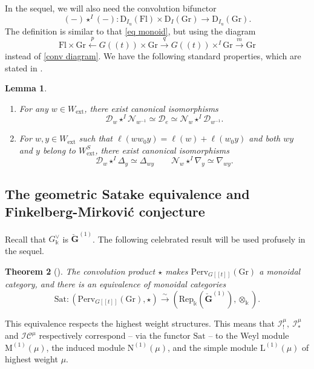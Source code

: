 \documentclass[11pt]{amsart}
\theoremstyle{plain}
\newtheorem{thm}{Theorem}[section]
\newtheorem{lem}[thm]{Lemma}
\theoremstyle{remark}
\numberwithin{equation}{section}
\begin{document}
	In the sequel, we will also need the convolution bifunctor 
	$$(-)\star^I(-):\mathrm{D}_{I_\mathrm{u}}(\mathrm{Fl})\times  \mathrm{D}_{I}(\mathrm{Gr})\to \mathrm{D}_{I_\mathrm{u}}(\mathrm{Gr}).$$
	The definition is similar to that \eqref{eq monoid}, but using the diagram 
	$$\mathrm{Fl}\times\mathrm{Gr}\xleftarrow{p}G((t))\times \mathrm{Gr}\xrightarrow{q} G((t))\times^{I} \mathrm{Gr}\xrightarrow{m}\mathrm{Gr} $$
	instead of \eqref{conv diagram}. We have the following standard properties, which are stated in \cite[Lemma 3.1]{achar2022geometric}.
	\begin{lem}\label{lem conv standard}
 \begin{enumerate}
     \item For any $w\in W_\mathrm{ext}$, there exist canonical isomorphisms
     $$\mathcal{D}_w\star^I\mathcal{N}_{w^{-1}}\simeq \mathcal{D}_e\simeq \mathcal{N}_w\star^I\mathcal{D}_{w^{-1}}. $$
     \item For $w,y\in W_\mathrm{ext}$ such that $\ell(ww_0y)=\ell(w)+\ell(w_0y)$ and both $wy$ and $y$ belong to $W_\mathrm{ext}^S$, there exist canonical isomorphisms
		$$\mathcal{D}_w\star^I\Delta_y\simeq\Delta_{wy}\qquad \mathcal{N}_w\star^I\nabla_y\simeq\nabla_{wy}.$$
 \end{enumerate}
	\end{lem}


	
	\subsection{The geometric Satake equivalence and Finkelberg-Mirkovi\'c conjecture} Recall that $G^\vee_\mathbb{k}$ is $\check{\mathbf{G}}^{(1)}$. The following celebrated result will be used profusely in the sequel.
	\begin{thm}[\cite{Mirkovic2004GeometricLD}]\label{satake equivalence1}
		The convolution product $\star$ makes $\mathrm{Perv}_{G[[t]]}(\mathrm{Gr})$ a monoidal category, and there is an equivalence of monoidal categories 
		$$\mathrm{Sat}:(\mathrm{Perv}_{G[[t]]}(\mathrm{Gr}),\star)\xrightarrow{\sim} (\mathrm{Rep}_\mathbb{k}(\check{\mathbf{G}}^{(1)}),\otimes_\mathbb{k}).$$
	\end{thm}
	
	
	This equivalence respects the highest weight structures. This means that $\mathcal{I}^\mu_!,~\mathcal{I}^\mu_*$ and $ \mathcal{IC}^\mu$ respectively correspond -- via the functor $\mathrm{Sat}$ -- to the Weyl module $\mathrm{M}^{(1)}(\mu)$, the induced module $\mathrm{N}^{(1)}(\mu)$, and the simple module $\mathrm{L}^{(1)}(\mu)$ of highest weight $\mu$. 
\end{document}
